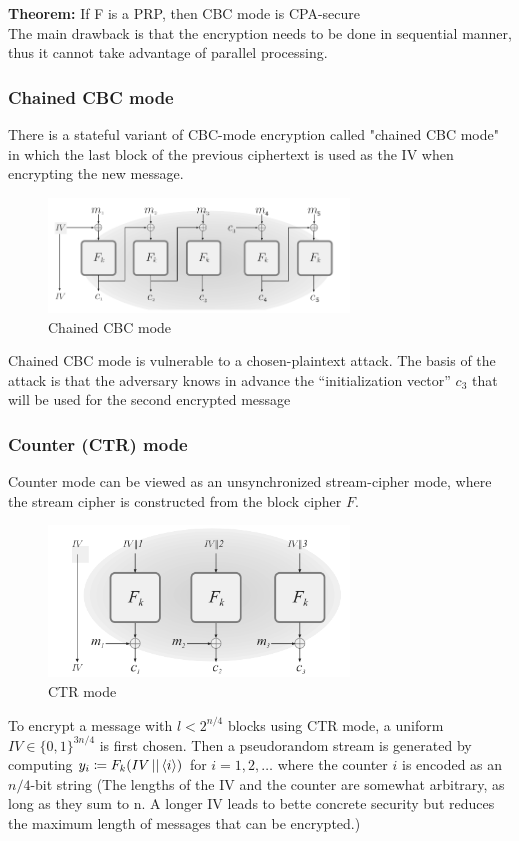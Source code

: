 \documentclass[12pt]{article}
\begin{document}
\textbf{Theorem:} If F is a PRP, then CBC mode is CPA-secure\\

The main drawback is that the encryption needs to be done in sequential manner, thus it cannot take advantage of parallel processing.

\subsubsection*{Chained CBC mode}
There is a stateful variant of CBC-mode encryption called "chained CBC mode" in which the last block of the previous ciphertext is used as the IV when encrypting the new message.
\begin{figure}[h]
    \centering
    \includegraphics[width=8cm]{figures/f4.png}
    \caption{Chained CBC mode}
\end{figure}

Chained CBC mode is vulnerable to a chosen-plaintext attack. The basis of the attack is that the adversary
knows in advance the “initialization vector” $c_3$ that will be used for the second encrypted message
 \subsubsection{Counter (CTR) mode}
Counter mode can be viewed as an unsynchronized stream-cipher mode, where the stream cipher is constructed from the block cipher $F$.
 \begin{figure}[h]
    \centering
    \includegraphics[width=8cm]{figures/f5.png}
    \caption{CTR mode}
\end{figure}

To encrypt a message with $l < 2^{n/4}$ blocks using CTR mode, a uniform $IV \in \{0,1\}^{3n/4}$ is first chosen.
 Then a pseudorandom stream is generated by computing $y_i \coloneqq F_k(IV\,||\, \langle i \rangle)$ for $i = 1,2,\dots$ where the counter $i$ is encoded as an $n/4$-bit string (The lengths of the IV and the counter are somewhat arbitrary, as long as they sum to n. A longer IV leads to bette concrete security but reduces the maximum length of messages that can be encrypted.)
 
\end{document}
